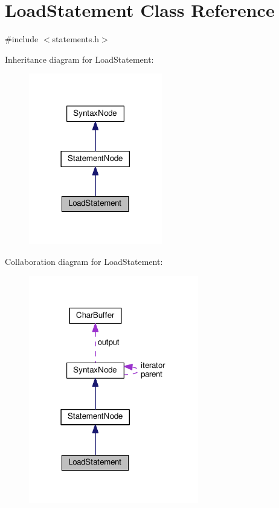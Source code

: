 \hypertarget{classLoadStatement}{}\section{Load\+Statement Class Reference}
\label{classLoadStatement}


{\ttfamily \#include $<$statements.\+h$>$}



Inheritance diagram for Load\+Statement\+:
\nopagebreak
\begin{figure}[H]
\begin{center}
\leavevmode
\includegraphics[width=165pt]{dc/db3/classLoadStatement__inherit__graph}
\end{center}
\end{figure}


Collaboration diagram for Load\+Statement\+:
\nopagebreak
\begin{figure}[H]
\begin{center}
\leavevmode
\includegraphics[width=210pt]{d5/dc3/classLoadStatement__coll__graph}
\end{center}
\end{figure}
